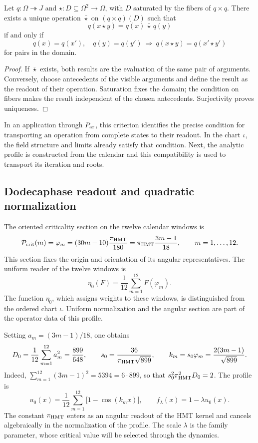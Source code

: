 \begin{proposition}
\label{hmtfg:criterio-descenso}
Let \(q:\Omega\twoheadrightarrow J\) and
\(\star:D\subseteq\Omega^2\to\Omega\), with \(D\) saturated by the fibers of \(q\times q\). There exists a unique operation \(\bar\star\) on \((q\times q)(D)\) such that
\[
 q(x\star y)=q(x)\,\bar\star\,q(y)
\]
if and only if
\[
 q(x)=q(x'),\quad q(y)=q(y')
 \ \Longrightarrow\ q(x\star y)=q(x'\star y')
\]
for pairs in the domain.
\end{proposition}
\begin{proof}
If \(\bar\star\) exists, both results are the evaluation of the same pair of arguments. Conversely, choose antecedents of the visible arguments and define the result as the readout of their operation. Saturation fixes the domain; the condition on fibers makes the result independent of the chosen antecedents. Surjectivity proves uniqueness.
\end{proof}

In an application through \(P_{\rm ar}\), this criterion identifies the precise condition for transporting an operation from complete states to their readout. In the chart \(\iota\), the field structure and limits already satisfy that condition. Next, the analytic profile is constructed from the calendar and this compatibility is used to transport its iteration and roots.

\subsection{Dodecaphase readout and quadratic normalization}
\label{hmtfg:perfil-dodecafasico}

The oriented criticality section on the twelve calendar windows is
\[
 \mathcal P_{\rm crit}(m)=\varphi_m
   =(30m-10)\frac{\pi_{\rm HMT}}{180}
   =\pi_{\rm HMT}\frac{3m-1}{18},\qquad m=1,\ldots,12.
\]
This section fixes the origin and orientation of its angular representatives. The uniform reader of the twelve windows is
\[
 \eta_0(F)=\frac1{12}\sum_{m=1}^{12}F(\varphi_m).
\]
The function \(\eta_0\), which assigns weights to these windows, is distinguished from the ordered chart \(\iota\). Uniform normalization and the angular section are part of the operator data of this profile.

Setting \(a_m=(3m-1)/18\), one obtains
\[
 D_0=\frac1{12}\sum_{m=1}^{12}a_m^2=\frac{899}{648},
 \qquad
 s_0=\frac{36}{\pi_{\rm HMT}\sqrt{899}},\qquad
 k_m=s_0\varphi_m=\frac{2(3m-1)}{\sqrt{899}}.
\]
Indeed, \(\sum_{m=1}^{12}(3m-1)^2=5394=6\cdot899\), so that \(s_0^2\pi_{\rm HMT}^2D_0=2\). The profile is
\begin{equation}
 u_0(x)=\frac1{12}\sum_{m=1}^{12}\bigl[1-\cos(k_mx)\bigr],
 \qquad f_\lambda(x)=1-\lambda u_0(x).
 \label{hmtfg:perfil-familia}
\end{equation}
The constant \(\pi_{\rm HMT}\) enters as an angular readout of the HMT kernel and cancels algebraically in the normalization of the profile. The scale \(\lambda\) is the family parameter, whose critical value will be selected through the dynamics.


